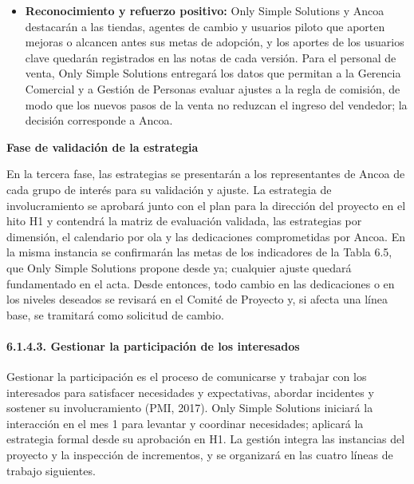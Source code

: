\documentclass[11pt]{article}
\begin{document}
\begin{itemize}
  la separación de datos. Las jefaturas, vendedores y cajeros de las
  tiendas del piloto probarán la solución antes de cada ola, y se
  realizarán talleres con vendedores de marketplace, proveedores y
  transportistas, a través de Ancoa, para validar sus integraciones.
  Only Simple Solutions se compromete a que cada una de las 22 tiendas cuente con un agente de cambio activo antes del hito H6. La designación corresponde a la jefatura de cada tienda y es una dependencia de Ancoa; Only Simple Solutions propondrá el perfil, capacitará a los agentes y escalará al Comité de Proyecto toda designación pendiente.
\item
  \textbf{Reconocimiento y refuerzo positivo:} Only Simple Solutions y
  Ancoa destacarán a las tiendas, agentes de cambio y usuarios piloto
  que aporten mejoras o alcancen antes sus metas de adopción, y los
  aportes de los usuarios clave quedarán registrados en las notas de
  cada versión. Para el personal de venta, Only Simple Solutions
  entregará los datos que permitan a la Gerencia Comercial y a Gestión
  de Personas evaluar ajustes a la regla de comisión, de modo que los
  nuevos pasos de la venta no reduzcan el ingreso del vendedor; la
  decisión corresponde a Ancoa.
\end{itemize}

\textbf{Fase de validación de la estrategia}

En la tercera fase, las estrategias se presentarán a los representantes
de Ancoa de cada grupo de interés para su validación y ajuste. La
estrategia de involucramiento se aprobará junto con el plan para la
dirección del proyecto en el hito H1 y contendrá la matriz de evaluación
validada, las estrategias por dimensión, el calendario por ola y las
dedicaciones comprometidas por Ancoa. En la misma instancia se confirmarán las metas de los indicadores de la Tabla 6.5, que Only Simple Solutions propone desde ya; cualquier ajuste quedará fundamentado en el acta. Desde entonces, todo
cambio en las dedicaciones o en los niveles deseados se revisará en el
Comité de Proyecto y, si afecta una línea base, se tramitará como
solicitud de cambio.

\paragraph{6.1.4.3. Gestionar la participación de los interesados}\label{6-1-4-3-gestionar-la-participacion-de-los-interesados}

Gestionar la participación es el proceso de comunicarse y trabajar con los interesados para satisfacer necesidades y expectativas, abordar incidentes y sostener su involucramiento (PMI, 2017). Only Simple Solutions iniciará la interacción en el mes 1 para levantar y coordinar necesidades; aplicará la estrategia formal desde su aprobación en H1. La gestión integra las instancias del proyecto y la inspección de incrementos, y se organizará en las cuatro líneas de trabajo siguientes.
\end{document}

